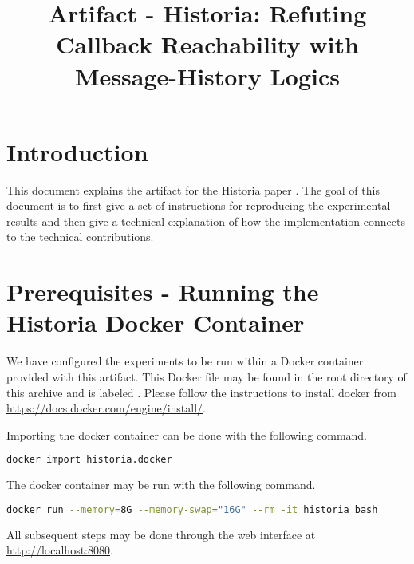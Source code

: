 \documentclass{acmart} %
\begin{document}

%
\title{Artifact - Historia: Refuting Callback Reachability with Message-History Logics}

\begin{abstract}
\end{abstract}


\maketitle
%
\section{Introduction}
This document explains the artifact for the Historia paper \cite{conf/oopsla/Meier23}.
The goal of this document is to first give a set of instructions for reproducing the experimental results and then give a technical explanation of how the implementation connects to the technical contributions.

\section{Prerequisites - Running the Historia Docker Container}

We have configured the experiments to be run within a Docker container provided with this artifact.
This Docker file may be found in the root directory of this archive and is labeled .  Please follow the instructions to install docker from \url{https://docs.docker.com/engine/install/}.

Importing the docker container can be done with the following command.

\begin{lstlisting}[language=bash]
  docker import historia.docker
\end{lstlisting}

The docker container may be run with the following command. 
\begin{lstlisting}[language=bash]
  docker run --memory=8G --memory-swap="16G" --rm -it historia bash
\end{lstlisting}

All subsequent steps may be done through the web interface at  \url{http://localhost:8080}.
\end{document}
